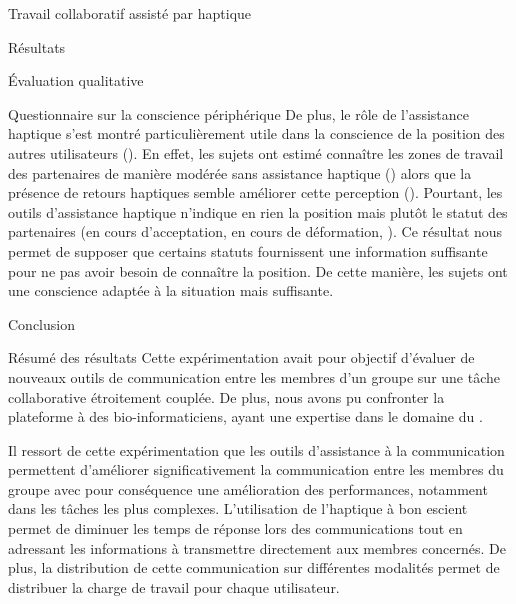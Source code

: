 \documentclass[myfrancais,ngerman,english,frenchb]{mythesis}
\begin{document}
\begin{mychapter}{Travail collaboratif assisté par haptique}
\begin{mysection}{Résultats}
\begin{mysubsection}{Évaluation qualitative}
\begin{mysubsubsection}{Questionnaire sur la conscience périphérique}
					De plus, le rôle de l'assistance haptique s'est montré particulièrement utile dans la conscience de la position des autres utilisateurs ().
					En effet, les sujets ont estimé connaître les zones de travail des partenaires de manière modérée sans assistance haptique () alors que la présence de retours haptiques semble améliorer cette perception ().
					Pourtant, les outils d'assistance haptique n'indique en rien la position mais plutôt le statut des partenaires (en cours d'acceptation, en cours de déformation, \myetc).
					Ce résultat nous permet de supposer que certains statuts fournissent une information suffisante pour ne pas avoir besoin de connaître la position.
					De cette manière, les sujets ont une conscience adaptée à la situation mais suffisante.
				\end{mysubsubsection}
			\end{mysubsection}
		\end{mysection}
		\begin{mysection}{Conclusion}
			\begin{mysubsection}{Résumé des résultats}
				Cette expérimentation avait pour objectif d'évaluer de nouveaux outils de communication entre les membres d'un groupe sur une tâche collaborative étroitement couplée.
				De plus, nous avons pu confronter la plateforme \myShaddock à des bio-informaticiens, ayant une expertise dans le domaine du .

				Il ressort de cette expérimentation que les outils d'assistance à la communication permettent d'améliorer significativement la communication entre les membres du groupe avec pour conséquence une amélioration des performances, notamment dans les tâches les plus complexes.
				L'utilisation de l'haptique à bon escient permet de diminuer les temps de réponse lors des communications tout en adressant les informations à transmettre directement aux membres concernés.
				De plus, la distribution de cette communication sur différentes modalités permet de distribuer la charge de travail pour chaque utilisateur.


\end{mysubsection}
\end{mysection}
\end{mychapter}
\end{document}

